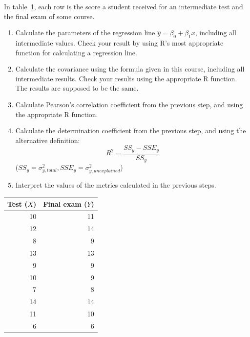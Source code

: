 \begin{exercise}
  \label{ex:regression-manual}
  
  In table~\ref{tab:test-exam}, each row is the score a student received for an intermediate test and the final exam of some course.
  \begin{enumerate}
    \item Calculate the parameters of the regression line $\hat{y}=\beta_{0} + \beta_{1} x$, including all intermediate values. Check your result by using R's most appropriate function for calculating a regression line.
    \item Calculate the covariance using the formula given in this course, including all intermediate results. Check your results using the appropriate R function. The results are supposed to be the same.
    \item Calculate Pearson's correlation coefficient from the previous step, and using the appropriate R function.
    \item Calculate the determination coefficient from the previous step, and using the alternative definition:
    \[R^2 = \frac{SS_y - SSE_y}{SS_y}\]
    ($SS_y=\sigma_{y,total}^2, SSE_y=\sigma_{y,unexplained}^2$)
    \item Interpret the values of the metrics calculated in the previous steps.
  \end{enumerate}
\end{exercise}

\begin{table}
  \centering
  \begin{tabular}{@{}rr@{}} \toprule
    Test ($X$) & Final exam ($Y$) \\
    \midrule
    10 & 11 \\
    12 & 14 \\
    8 & 9 \\
    13 & 13 \\
    9 & 9 \\
    10 &  9 \\
    7 & 8 \\
    14 & 14 \\
    11 & 10 \\
    6 & 6  \\
    \bottomrule
  \end{tabular}
  \label{tab:test-exam}
\end{table}

